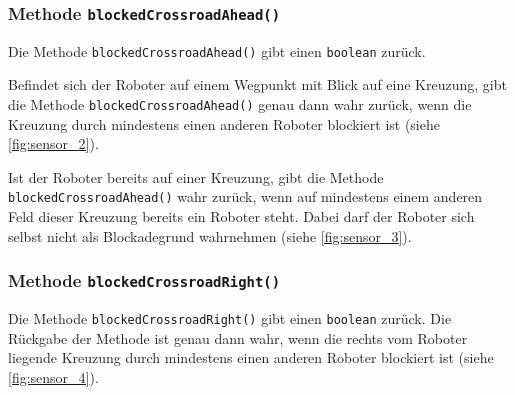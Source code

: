 \enlargethispage{1\baselineskip}

\subsubsection{Methode \texttt{blockedCrossroadAhead()}}

Die Methode \texttt{blockedCrossroadAhead()} gibt einen \texttt{boolean} zurück.

Befindet sich der Roboter auf einem Wegpunkt mit Blick auf eine Kreuzung, gibt die Methode \texttt{blockedCrossroadAhead()} genau dann wahr zurück, wenn die Kreuzung durch mindestens einen anderen Roboter blockiert ist (siehe \autoref{fig:sensor_2}).

Ist der Roboter bereits auf einer Kreuzung, gibt die Methode \texttt{blockedCrossroadAhead()} wahr zurück, wenn auf mindestens einem anderen Feld dieser Kreuzung bereits ein Roboter steht. 
Dabei darf der Roboter sich selbst nicht als Blockadegrund wahrnehmen (siehe \autoref{fig:sensor_3}).


\subsubsection{Methode \texttt{blockedCrossroadRight()}}

Die Methode \texttt{blockedCrossroadRight()} gibt einen \texttt{boolean} zurück.
Die Rückgabe der Methode ist genau dann wahr, wenn die rechts vom Roboter liegende Kreuzung durch mindestens einen anderen Roboter blockiert ist (siehe \autoref{fig:sensor_4}).



